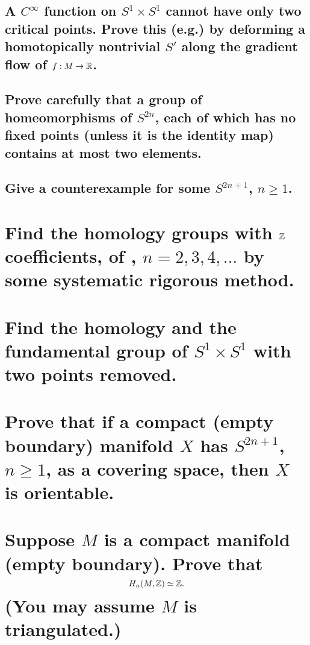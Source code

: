 \documentclass[10pt]{article}
\begin{document}
\subsection{A $C^\infty$ function on $S^1 \times S^1$ cannot have only two critical points. Prove
  this (e.g.) by deforming a homotopically nontrivial $S'$ along the gradient flow of $f: M \to \mathbb{R}$. }

\advsection{}

\subsection{Prove carefully that a group of homeomorphisms of $S^{2n}$, each of which has no fixed
  points (unless it is the identity map) contains at most two elements.}

\subsection{Give a counterexample for some $S^{2n+1}$, $n \geq 1$.}

\section{Find the homology groups with $\mathbb{Z}$ coefficients, of , $n=2,3,4,
  \dots$ by some systematic rigorous method.}

\section{Find the homology and the fundamental group of $S^1 \times S^1$ with two points removed.}

\section{Prove that if a compact (empty boundary) manifold $X$ has $S^{2n+1}$, $n \geq 1$, as a
  covering space, then $X$ is orientable.}

\section{Suppose $M$ is a compact manifold (empty boundary). Prove that
$$H_n(M,\mathbb{Z} ) \simeq \mathbb{Z}.$$
(You may assume $M$ is triangulated.)}
\end{document}
